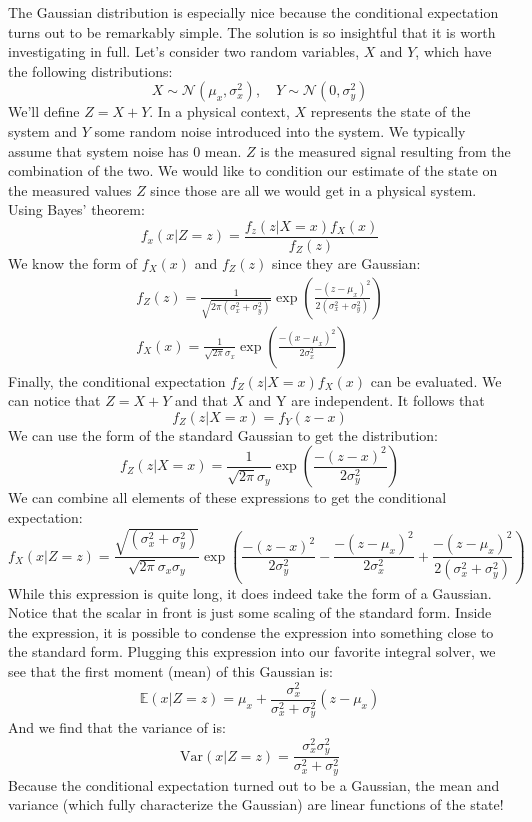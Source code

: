 The Gaussian distribution is especially nice because the conditional expectation turns out to be remarkably simple. The solution is so insightful that it is worth investigating in full. Let's consider two random variables, $X$ and $Y$, which have the following distributions:
$$X\sim\mathcal{N}(\mu_x,\sigma_x^2),\quad Y\sim\mathcal{N}(0,
\sigma_y^2)$$
We'll define $Z=X+Y$. In a physical context, $X$ represents the state of the system and $Y$ some random noise introduced into the system. We typically assume that system noise has 0 mean. $Z$ is the measured signal resulting from the combination of the two. We would like to condition our estimate of the state on the measured values $Z$ since those are all we would get in a physical system. Using Bayes' theorem:
$$f_x(x|Z=z)=\frac{f_z(z|X=x)f_X(x)}{f_Z(z)}$$
We know the form of $f_X(x)$ and $f_Z(z)$ since they are Gaussian:
\begin{gather}
f_Z(z)=\frac{1}{\sqrt{2\pi(\sigma_x^2+\sigma_y^2)}}\exp\left(\frac{-(z-\mu_x)^2}{2(\sigma_x^2+\sigma_y^2)}\right)\\
f_X(x)=\frac{1}{\sqrt{2\pi}\sigma_x}\exp\left(\frac{-(x-\mu_x)^2}{2\sigma_x^2}\right)
\end{gather}
Finally, the conditional expectation $f_Z(z|X=x)f_X(x)$ can be evaluated. We can notice that $Z=X+Y$ and that $X$ and Y are independent. It follows that
$$f_Z(z|X=x)=f_Y(z-x)$$
We can use the form of the standard Gaussian to get the distribution:
$$f_Z(z|X=x)=\frac{1}{\sqrt{2\pi}\sigma_y}\exp\left(\frac{-(z-x)^2}{2\sigma_y^2}\right)$$
We can combine all elements of these expressions to get the conditional expectation:
$$f_X(x|Z=z)=\frac{\sqrt{(\sigma_x^2+\sigma_y^2)}}{\sqrt{2\pi}\sigma_x\sigma_y}\exp\left(\frac{-(z-x)^2}{2\sigma_y^2}-\frac{-(z-\mu_x)^2}{2\sigma_x^2}+\frac{-(z-\mu_x)^2}{2(\sigma_x^2+\sigma_y^2)}\right)$$
While this expression is quite long, it does indeed take the form of a Gaussian. Notice that the scalar in front is just some scaling of the standard form. Inside the expression, it is possible to condense the expression into something close to the standard form. Plugging this expression into our favorite integral solver, we see that the first moment (mean) of this Gaussian is:
$$\mathbb{E}(x|Z=z)=\mu_x+\frac{\sigma_x^2}{\sigma_x^2+\sigma_y^2}(z-\mu_x)$$
And we find that the variance of is:
$$\text{Var}(x|Z=z)=\frac{\sigma_x^2\sigma_y^2}{\sigma_x^2+\sigma_y^2}$$
Because the conditional expectation turned out to be a Gaussian, the mean and variance (which fully characterize the Gaussian) are linear functions of the state!

